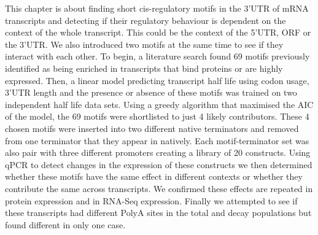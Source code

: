 \documentclass[../main.tex]{subfiles}
\begin{document}
This chapter is about finding short cis-regulatory motifs in the 3'UTR of mRNA transcripts and detecting if their regulatory behaviour is dependent on the context of the whole transcript. This could be the context of the 5'UTR, ORF or the 3'UTR. We also introduced two motifs at the same time to see if they interact with each other. To begin, a literature search found 69 motifs previously identified as being enriched in transcripts that bind proteins or are highly expressed. Then, a linear model predicting transcript half life using codon usage, 3'UTR length and the presence or absence of these motifs was trained on two independent half life data sets. Using a greedy algorithm that maximised the AIC of the model, the 69 motifs were shortlisted to just 4 likely contributors. These 4 chosen motifs were inserted into two different native terminators and removed from one terminator that they appear in natively. Each motif-terminator set was also pair with three different promoters creating a library of 20 constructs. Using qPCR to detect changes in the expression of these constructs we then determined whether these motifs have the same effect in different contexts or whether they contribute the same across transcripts. We confirmed these effects are repeated in protein expression and in RNA-Seq expression. Finally we attempted to see if these transcripts had different PolyA sites in the total and decay populations but found different in only one case.
\end{document}
